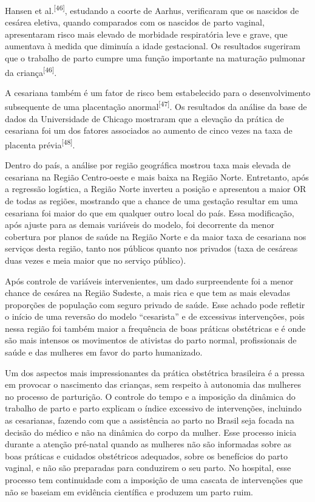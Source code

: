 \documentclass{article}
\begin{document}
Hansen et al.\textsuperscript{[}\textsuperscript{46}\textsuperscript{]}, estudando a
coorte de Aarhus, verificaram que os nascidos de cesárea eletiva, quando
comparados
com os nascidos de parto vaginal, apresentaram risco mais elevado de morbidade
respiratória leve e grave, que aumentava à medida que diminuía a idade
gestacional.
Os resultados sugeriram que o trabalho de parto cumpre uma função importante na
maturação pulmonar da criança\textsuperscript{[}\textsuperscript{46}\textsuperscript{]}.

A cesariana também é um fator de risco bem estabelecido para o desenvolvimento
subsequente de uma placentação anormal\textsuperscript{[}\textsuperscript{47}\textsuperscript{]}. Os resultados da análise da base de dados da Universidade
de Chicago mostraram que a elevação da prática de cesariana foi um dos fatores
associados ao aumento de cinco vezes na taxa de placenta prévia\textsuperscript{[}\textsuperscript{48}\textsuperscript{]}.

Dentro do país, a análise por região geográfica mostrou taxa mais elevada de
cesariana na Região Centro-oeste e mais baixa na Região Norte. Entretanto, após
a
regressão logística, a Região Norte inverteu a posição e apresentou a maior OR
de
todas as regiões, mostrando que a chance de uma gestação resultar em uma
cesariana
foi maior do que em qualquer outro local do país. Essa modificação, após ajuste
para
as demais variáveis do modelo, foi decorrente da menor cobertura por planos de
saúde
na Região Norte e da maior taxa de cesariana nos serviços desta região, tanto
nos
públicos quanto nos privados (taxa de cesáreas duas vezes e meia maior que no
serviço público).

Após controle de variáveis intervenientes, um dado surpreendente foi a menor
chance
de cesárea na Região Sudeste, a mais rica e que tem as mais elevadas proporções
de
população com seguro privado de saúde. Esse achado pode refletir o início de uma
reversão do modelo “cesarista” e de excessivas intervenções, pois nessa região
foi
também maior a frequência de boas práticas obstétricas e é onde são mais
intensos os
movimentos de ativistas do parto normal, profissionais de saúde e das mulheres
em
favor do parto humanizado.

Um dos aspectos mais impressionantes da prática obstétrica brasileira é a pressa
em
provocar o nascimento das crianças, sem respeito à autonomia das mulheres no
processo de parturição. O controle do tempo e a imposição da dinâmica do
trabalho de
parto e parto explicam o índice excessivo de intervenções, incluindo as
cesarianas,
fazendo com que a assistência ao parto no Brasil seja focada na decisão do
médico e
não na dinâmica do corpo da mulher. Esse processo inicia durante a atenção
pré-natal
quando as mulheres não são informadas sobre as boas práticas e cuidados
obstétricos
adequados, sobre os benefícios do parto vaginal, e não são preparadas para
conduzirem o seu parto. No hospital, esse processo tem continuidade com a
imposição
de uma cascata de intervenções que não se baseiam em evidência científica e
produzem
um parto ruim.
\end{document}
